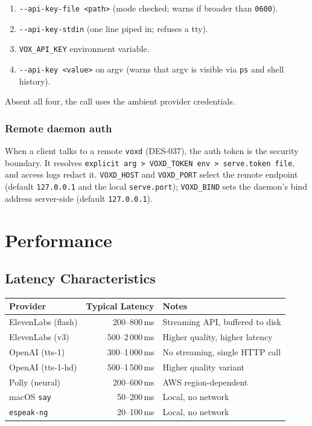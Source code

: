 \documentclass[a4paper,10pt]{article}
\begin{document}
\begin{enumerate}
  \item \texttt{-{}-api-key-file <path>} (mode checked; warns if broader
    than \texttt{0600}).
  \item \texttt{-{}-api-key-stdin} (one line piped in; refuses a tty).
  \item \texttt{VOX\_API\_KEY} environment variable.
  \item \texttt{-{}-api-key <value>} on argv (warns that argv is visible
    via \texttt{ps} and shell history).
\end{enumerate}

Absent all four, the call uses the ambient provider credentials.

\subsubsection*{Remote daemon auth}

When a client talks to a remote \texttt{voxd} (DES-037), the auth token
is the security boundary.  It resolves \texttt{explicit arg > VOXD\_TOKEN
env > serve.token file}, and access logs redact it.  \texttt{VOXD\_HOST}
and \texttt{VOXD\_PORT} select the remote endpoint (default
\texttt{127.0.0.1} and the local \texttt{serve.port}); \texttt{VOXD\_BIND}
sets the daemon's bind address server-side (default \texttt{127.0.0.1}).


\section{Performance}

\subsection{Latency Characteristics}

\begin{center}
\begin{tabular}{lrl}
\toprule
\textbf{Provider} & \textbf{Typical Latency} & \textbf{Notes} \\
\midrule
ElevenLabs (flash) & 200--800\,ms & Streaming API, buffered to disk \\
ElevenLabs (v3)    & 500--2\,000\,ms & Higher quality, higher latency \\
OpenAI (tts-1)     & 300--1\,000\,ms & No streaming, single HTTP call \\
OpenAI (tts-1-hd)  & 500--1\,500\,ms & Higher quality variant \\
Polly (neural)     & 200--600\,ms & AWS region-dependent \\
macOS \texttt{say} & 50--200\,ms & Local, no network \\
\texttt{espeak-ng} & 20--100\,ms & Local, no network \\
\bottomrule
\end{tabular}
\end{center}
\end{document}
